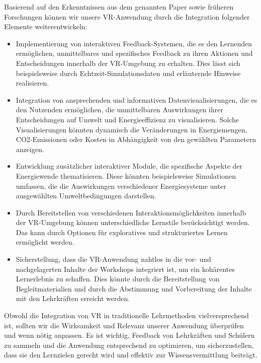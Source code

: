 \documentclass[draft]{vutinfth} %
\begin{document}
Basierend auf den Erkenntnissen aus dem genannten Paper sowie früheren Forschungen können wir unsere VR-Anwendung durch die Integration folgender Elemente weiterentwickeln:

\begin{itemize}

    \item Implementierung von interaktiven Feedback-Systemen, die es den Lernenden ermöglichen, unmittelbares und spezifisches Feedback zu ihren Aktionen und Entscheidungen innerhalb der VR-Umgebung zu erhalten. Dies lässt sich beispielsweise durch Echtzeit-Simulationsdaten und erläuternde Hinweise realisieren.

    \item Integration von ansprechenden und informativen Datenvisualisierungen, die es den Nutzenden ermöglichen, die unmittelbaren Auswirkungen ihrer Entscheidungen auf Umwelt und Energieeffizienz zu visualisieren. Solche Visualisierungen könnten dynamisch die Veränderungen in Energiemengen, CO2-Emissionen oder Kosten in Abhängigkeit von den gewählten Parametern anzeigen.

    \item Entwicklung zusätzlicher interaktiver Module, die spezifische Aspekte der Energiewende thematisieren. Diese könnten beispielsweise Simulationen umfassen, die die Auswirkungen verschiedener Energiesysteme unter ausgewählten Umweltbedingungen darstellen.

    \item Durch Bereitstellen von verschiedenen Interaktionsmöglichkeiten innerhalb der VR-Umgebung können unterschiedliche Lernstile berücksichtigt werden. Das kann durch Optionen für exploratives und strukturiertes Lernen ermöglicht werden.

    \item Sicherstellung, dass die VR-Anwendung nahtlos in die vor- und nachgelagerten Inhalte der Workshops integriert ist, um ein kohärentes Lernerlebnis zu schaffen. Dies könnte durch die Bereitstellung von Begleitmaterialien und durch die Abstimmung und Vorbereitung der Inhalte mit den Lehrkräften erreicht werden.

\end{itemize}

Obwohl die Integration von VR in traditionelle Lehrmethoden vielversprechend ist, sollten wir die Wirksamkeit und Relevanz unserer Anwendung überprüfen und wenn nötig anpassen. Es ist wichtig, Feedback von Lehrkräften und Schülern zu sammeln und die Anwendung entsprechend zu optimieren, um sicherzustellen, dass sie den Lernzielen gerecht wird und effektiv zur Wissensvermittlung beiträgt.
\end{document}
